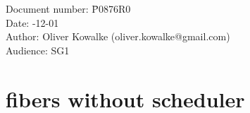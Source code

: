 \documentclass[fontsize=10pt,paper=A4,pagesize,DIV=15]{scrartcl}
\begin{document}
\small
\begin{tabbing}
    Document number: \= P0876R0\\
    Date:            -12-01\\
    Author:          \> Oliver Kowalke (oliver.kowalke@gmail.com)\\
    Audience:        \> SG1\\
\end{tabbing}

\section*{fibers without scheduler}


\tableofcontents























\end{document}
